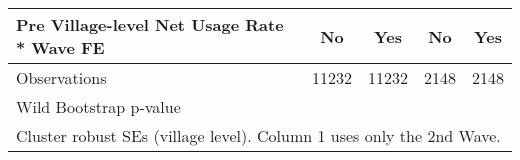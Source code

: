 {\begin{tabular}{l*{4}{c}}
Pre Village-level Net Usage Rate * Wave FE&          No         &         Yes         &          No         &         Yes         \\
\hline
Observations        &       11232         &       11232         &        2148         &        2148         \\
Wild Bootstrap p-value &                     &                     &                     &                     \\
\hline\hline
\multicolumn{5}{l}{\footnotesize Cluster robust SEs (village level). Column 1 uses only the 2nd Wave.}\\
\end{tabular}
}
